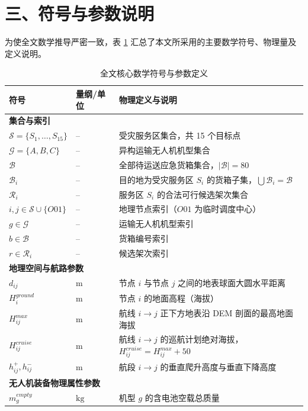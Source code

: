 \documentclass[withoutpreface,bwprint]{format}
\begin{document}
\section{三、符号与参数说明}

为使全文数学推导严密一致，表 \ref{tab:notations} 汇总了本文所采用的主要数学符号、物理量及定义说明。

\begin{table}[H]
\centering
\small
\caption{全文核心数学符号与参数定义}
\label{tab:notations}
\begin{tabularx}{\textwidth}{p{3.2cm} p{2.2cm} X}
\toprule
\textbf{符号} & \textbf{量纲/单位} & \textbf{物理定义与说明} \\
\midrule
\multicolumn{3}{l}{\textbf{集合与索引}} \\
$\mathcal{S} = \{S_1, \dots, S_{15}\}$ & -- & 受灾服务区集合，共 15 个目标点 \\
$\mathcal{G} = \{A, B, C\}$ & -- & 异构运输无人机机型集合 \\
$\mathcal{B}$ & -- & 全部待运送应急货箱集合，$|\mathcal{B}| = 80$ \\
$\mathcal{B}_i$ & -- & 目的地为受灾服务区 $S_i$ 的货箱子集，$\bigcup \mathcal{B}_i = \mathcal{B}$ \\
$\mathcal{R}_i$ & -- & 服务区 $S_i$ 的合法可行候选架次集合 \\
$i, j \in \mathcal{S} \cup \{O01\}$ & -- & 地理节点索引（$O01$ 为临时调度中心） \\
$g \in \mathcal{G}$ & -- & 运输无人机机型索引 \\
$b \in \mathcal{B}$ & -- & 货箱编号索引 \\
$r \in \mathcal{R}_i$ & -- & 候选架次索引 \\
\midrule
\multicolumn{3}{l}{\textbf{地理空间与航路参数}} \\
$d_{ij}$ & $\text{m}$ & 节点 $i$ 与节点 $j$ 之间的地表球面大圆水平距离 \\
$H_i^{ground}$ & $\text{m}$ & 节点 $i$ 的地面高程（海拔） \\
$H_{ij}^{max}$ & $\text{m}$ & 航线 $i \to j$ 正下方地表沿 DEM 剖面的最高地面海拔 \\
$H_{ij}^{cruise}$ & $\text{m}$ & 航线 $i \to j$ 的巡航计划绝对海拔，$H_{ij}^{cruise} = H_{ij}^{max} + 50$ \\
$h_{ij}^+, h_{ij}^-$ & $\text{m}$ & 航段 $i \to j$ 的垂直爬升高度与垂直下降高度 \\
\midrule
\multicolumn{3}{l}{\textbf{无人机装备物理属性参数}} \\
$m_g^{empty}$ & $\text{kg}$ & 机型 $g$ 的含电池空载总质量 \\

\end{tabularx}
\end{table}
\end{document}
